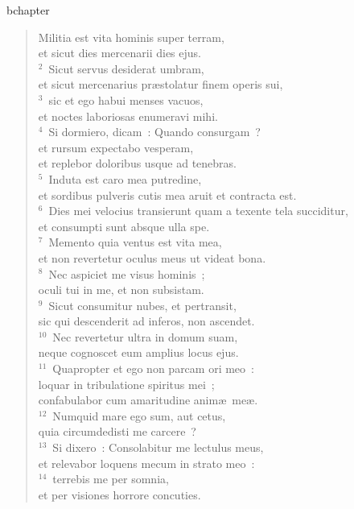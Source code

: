 bchapter\begin{flushleft}\begin{verse}\vspace{-19pt}Militia est vita hominis super terram,\\ et sicut dies mercenarii dies ejus.\\
${}^{2}$~Sicut servus desiderat umbram,\\ et sicut mercenarius pr\ae stolatur finem operis sui,\\
${}^{3}$~sic et ego habui menses vacuos,\\ et noctes laboriosas enumeravi mihi.\\
${}^{4}$~Si dormiero, dicam~: Quando consurgam~?\\ et rursum expectabo vesperam,\\ et replebor doloribus usque ad tenebras.\\
${}^{5}$~Induta est caro mea putredine,\\ et sordibus pulveris cutis mea aruit et contracta est.\\
${}^{6}$~Dies mei velocius transierunt quam a texente tela succiditur,\\ et consumpti sunt absque ulla spe.\\
${}^{7}$~Memento quia ventus est vita mea,\\ et non revertetur oculus meus ut videat bona.\\
${}^{8}$~Nec aspiciet me visus hominis~;\\ oculi tui in me, et non subsistam.\\
${}^{9}$~Sicut consumitur nubes, et pertransit,\\ sic qui descenderit ad inferos, non ascendet.\\
${}^{10}$~Nec revertetur ultra in domum suam,\\ neque cognoscet eum amplius locus ejus.\\
${}^{11}$~Quapropter et ego non parcam ori meo~:\\ loquar in tribulatione spiritus mei~;\\ confabulabor cum amaritudine anim\ae\ me\ae .\\
${}^{12}$~Numquid mare ego sum, aut cetus,\\ quia circumdedisti me carcere~?\\
${}^{13}$~Si dixero~: Consolabitur me lectulus meus,\\ et relevabor loquens mecum in strato meo~:\\
${}^{14}$~terrebis me per somnia,\\ et per visiones horrore concuties.\\

\end{verse}
\end{flushleft}
